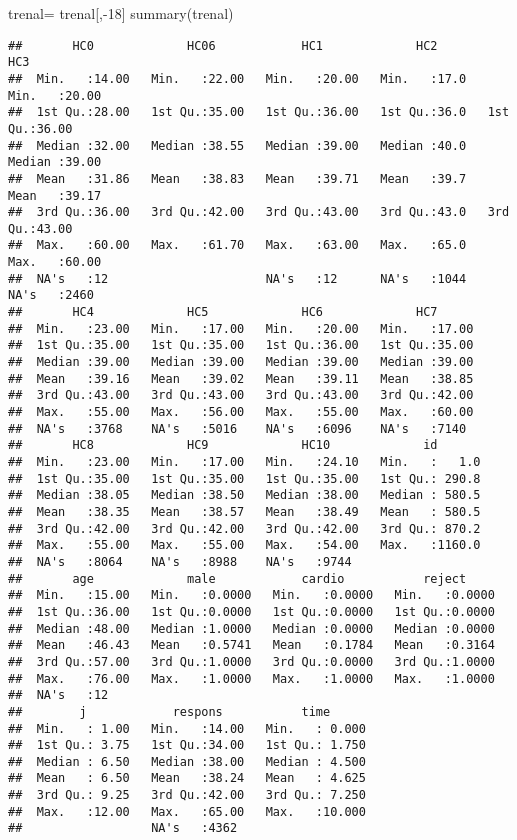 \documentclass[
]{article}
\newenvironment{Shaded}{\begin{snugshade}}{\end{snugshade}}
\newcommand{\DecValTok}[1]{\textcolor[rgb]{0.00,0.00,0.81}{#1}}
\newcommand{\FunctionTok}[1]{\textcolor[rgb]{0.00,0.00,0.00}{#1}}
\newcommand{\NormalTok}[1]{#1}
\newcommand{\OtherTok}[1]{\textcolor[rgb]{0.56,0.35,0.01}{#1}}
\newcommand{\SpecialCharTok}[1]{\textcolor[rgb]{0.00,0.00,0.00}{#1}}
\begin{document}
\begin{Shaded}
\begin{Highlighting}[]
\NormalTok{trenal}\OtherTok{=}\NormalTok{ trenal[,}\SpecialCharTok{{-}}\DecValTok{18}\NormalTok{]}
\FunctionTok{summary}\NormalTok{(trenal)}
\end{Highlighting}
\end{Shaded}

\begin{verbatim}
##       HC0             HC06            HC1             HC2            HC3       
##  Min.   :14.00   Min.   :22.00   Min.   :20.00   Min.   :17.0   Min.   :20.00  
##  1st Qu.:28.00   1st Qu.:35.00   1st Qu.:36.00   1st Qu.:36.0   1st Qu.:36.00  
##  Median :32.00   Median :38.55   Median :39.00   Median :40.0   Median :39.00  
##  Mean   :31.86   Mean   :38.83   Mean   :39.71   Mean   :39.7   Mean   :39.17  
##  3rd Qu.:36.00   3rd Qu.:42.00   3rd Qu.:43.00   3rd Qu.:43.0   3rd Qu.:43.00  
##  Max.   :60.00   Max.   :61.70   Max.   :63.00   Max.   :65.0   Max.   :60.00  
##  NA's   :12                      NA's   :12      NA's   :1044   NA's   :2460   
##       HC4             HC5             HC6             HC7       
##  Min.   :23.00   Min.   :17.00   Min.   :20.00   Min.   :17.00  
##  1st Qu.:35.00   1st Qu.:35.00   1st Qu.:36.00   1st Qu.:35.00  
##  Median :39.00   Median :39.00   Median :39.00   Median :39.00  
##  Mean   :39.16   Mean   :39.02   Mean   :39.11   Mean   :38.85  
##  3rd Qu.:43.00   3rd Qu.:43.00   3rd Qu.:43.00   3rd Qu.:42.00  
##  Max.   :55.00   Max.   :56.00   Max.   :55.00   Max.   :60.00  
##  NA's   :3768    NA's   :5016    NA's   :6096    NA's   :7140   
##       HC8             HC9             HC10             id        
##  Min.   :23.00   Min.   :17.00   Min.   :24.10   Min.   :   1.0  
##  1st Qu.:35.00   1st Qu.:35.00   1st Qu.:35.00   1st Qu.: 290.8  
##  Median :38.05   Median :38.50   Median :38.00   Median : 580.5  
##  Mean   :38.35   Mean   :38.57   Mean   :38.49   Mean   : 580.5  
##  3rd Qu.:42.00   3rd Qu.:42.00   3rd Qu.:42.00   3rd Qu.: 870.2  
##  Max.   :55.00   Max.   :55.00   Max.   :54.00   Max.   :1160.0  
##  NA's   :8064    NA's   :8988    NA's   :9744                    
##       age             male            cardio           reject      
##  Min.   :15.00   Min.   :0.0000   Min.   :0.0000   Min.   :0.0000  
##  1st Qu.:36.00   1st Qu.:0.0000   1st Qu.:0.0000   1st Qu.:0.0000  
##  Median :48.00   Median :1.0000   Median :0.0000   Median :0.0000  
##  Mean   :46.43   Mean   :0.5741   Mean   :0.1784   Mean   :0.3164  
##  3rd Qu.:57.00   3rd Qu.:1.0000   3rd Qu.:0.0000   3rd Qu.:1.0000  
##  Max.   :76.00   Max.   :1.0000   Max.   :1.0000   Max.   :1.0000  
##  NA's   :12                                                        
##        j            respons           time       
##  Min.   : 1.00   Min.   :14.00   Min.   : 0.000  
##  1st Qu.: 3.75   1st Qu.:34.00   1st Qu.: 1.750  
##  Median : 6.50   Median :38.00   Median : 4.500  
##  Mean   : 6.50   Mean   :38.24   Mean   : 4.625  
##  3rd Qu.: 9.25   3rd Qu.:42.00   3rd Qu.: 7.250  
##  Max.   :12.00   Max.   :65.00   Max.   :10.000  
##                  NA's   :4362
\end{verbatim}
\end{document}
